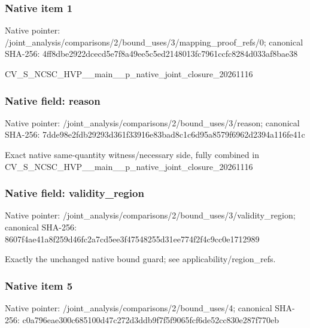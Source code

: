 \documentclass[10pt,a4paper]{article}
\begin{document}
\subsubsection{Native item 1}
Native pointer: /joint\_\allowbreak{}analysis/comparisons/2/bound\_\allowbreak{}uses/3/mapping\_\allowbreak{}proof\_\allowbreak{}refs/0; canonical SHA-256: 4ff8dbe2922dcecd5e7f8a49ee5c5ed2148013fc7961ccfc8284d033af8bae38

\begingroup\raggedright\sloppy CV\_\allowbreak{}S\_\allowbreak{}NCSC\_\allowbreak{}HVP\_\allowbreak{}\_\allowbreak{}main\_\allowbreak{}\_\allowbreak{}p\_\allowbreak{}native\_\allowbreak{}joint\_\allowbreak{}closure\_\allowbreak{}20261116\par\endgroup

\subsubsection{Native field: reason}
Native pointer: /joint\_\allowbreak{}analysis/comparisons/2/bound\_\allowbreak{}uses/3/reason; canonical SHA-256: 7dde98e2fdb29293d361f33916e83bad8c1c6d95a8579f6962d2394a116fe41c

\begingroup\raggedright\sloppy Exact native same-quantity witness/\allowbreak{}necessary side,\allowbreak{} fully combined in CV\_\allowbreak{}S\_\allowbreak{}NCSC\_\allowbreak{}HVP\_\allowbreak{}\_\allowbreak{}main\_\allowbreak{}\_\allowbreak{}p\_\allowbreak{}native\_\allowbreak{}joint\_\allowbreak{}closure\_\allowbreak{}20261116\par\endgroup

\subsubsection{Native field: validity\_\allowbreak{}region}
Native pointer: /joint\_\allowbreak{}analysis/comparisons/2/bound\_\allowbreak{}uses/3/validity\_\allowbreak{}region; canonical SHA-256: 8607f4ae41a8f259d46fc2a7cd5ee3f47548255d31ee774f2f4c9cc0e1712989

\begingroup\raggedright\sloppy Exactly the unchanged native bound guard;\allowbreak{} see applicability/\allowbreak{}region\_\allowbreak{}refs.\par\endgroup

\subsubsection{Native item 5}
Native pointer: /joint\_\allowbreak{}analysis/comparisons/2/bound\_\allowbreak{}uses/4; canonical SHA-256: c0a796eae300c685100d47c272d3ddb9f7f5f9065fcf6de52cc830e287f770eb
\end{document}
